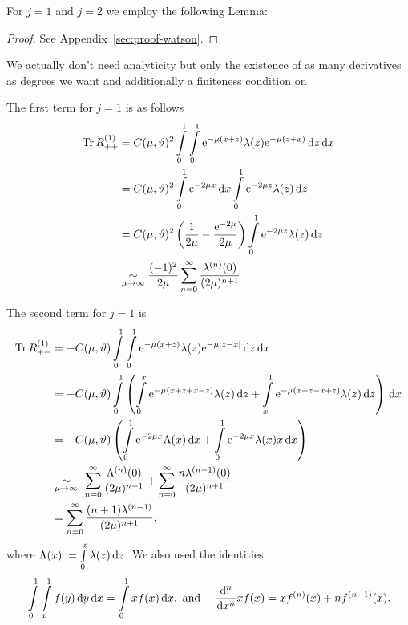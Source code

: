 For $j=1$ and $j=2$ we employ the following Lemma:
\begin{Lemma}[Watson]
    
    \begin{proof}
        See Appendix~\ref{sec:proof-watson}.
    \end{proof}
    \begin{Remark}
        We actually don't need analyticity but only the existence of as many
        derivatives as degrees we want and additionally a finiteness condition
        on
    \end{Remark}
\end{Lemma}

The first term for $j=1$ is as follows
\begin{align*}
    \Tr R^{(1)}_{++} &= C(\mu,\theta)^2
        \Integ[1]{0}{x}{
            \Integ[1]{0}{z}{\Eto{-\mu(x+z)}
                \lambda(z)\Eto{-\mu(z+x)}
            }
        }
        \\
        &= C(\mu,\theta)^2
            \Integ[1]{0}{x}{
                \Eto{-2\mu x}
            }
            \Integ[1]{0}{z}{\Eto{-2\mu z}\lambda(z)}
        \\
        &= C(\mu, \theta)^2 \left(
            \frac1{2\mu} - \frac{\Eto{-2\mu}}{2\mu}
           \right)
           \Integ[1]{0}{z}{\Eto{-2\mu z}\lambda(z)}
        \\
        &\SimAs{\mu\to\infty}
            \frac{(-1)^2}{2\mu}
            \sum_{n=0}^{\infty}\frac{\lambda^{(n)}(0)}{(2\mu)^{n+1}}
\end{align*}

The second term for $j=1$ is
\begin{align*}
    \Tr R^{(1)}_{+-} &= -C(\mu,\theta)
        \Integ[1]{0}{x}{
            \Integ[1]{0}{z}{\Eto{-\mu(x+z)}
                \lambda(z)\Eto{-\mu\left|z-x\right|}
            }
        } \\
        &= -C(\mu,\theta)
            \Integ[1]{0}{x}{\left(
                \Integ[x]{0}{z}{
                    \Eto{-\mu(x+z+x-z)} \lambda(z)
                }
                +
                \Integ[1]{x}{z}{
                    \Eto{-\mu(x+z-x+z)} \lambda(z)
                }
                \right)
            } \\
        &= -C(\mu,\theta) \left(
            \Integ[1]{0}{x}{\Eto{-2\mu x} \Lambda(x)}
            + \Integ[1]{0}{x}{\Eto{-2\mu x}\lambda(x)x}
            \right) \\
        &\SimAs{\mu\to\infty}\ 
            \sum_{n=0}^\infty \frac{\Lambda^{(n)}(0)}{(2\mu)^{n+1}}
            + \sum_{n=0}^\infty \frac{n\lambda^{(n-1)}(0)}{(2\mu)^{n+1}} \\
        &= \sum_{n=0}^\infty \frac{(n+1)\lambda^{(n-1)}}{(2\mu)^{n+1}},
\end{align*}
where $\Lambda(x) := \Integ[x]{0}{z}{\lambda(z)}$. We also used the identities
\begin{align*}
    &\Integ[1]{0}{x}{\Integ[1]{x}{y}{f(y)}} = \Integ[1]{0}{x}{xf(x)},
    \text{ and }
    &\frac{\mathrm d^n}{\mathrm dx^n}xf(x) = xf^{(n)}(x) + nf^{(n-1)}(x).
\end{align*}

